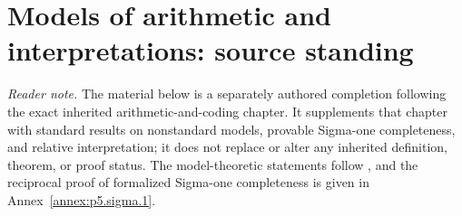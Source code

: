 
\section*{Models of arithmetic and interpretations: source standing}
\noindent\textit{Reader note.}  The material below is a separately authored
completion following the exact inherited arithmetic-and-coding chapter.  It
supplements that chapter with standard results on nonstandard models,
provable Sigma-one completeness, and relative interpretation; it does not
replace or alter any inherited definition, theorem, or proof status.  The
model-theoretic statements follow \cite{Kaye1991,Tennenbaum1959,Skolem1934},
and the reciprocal proof of formalized Sigma-one completeness is given in
Annex~\ref{annex:p5.sigma.1}.

